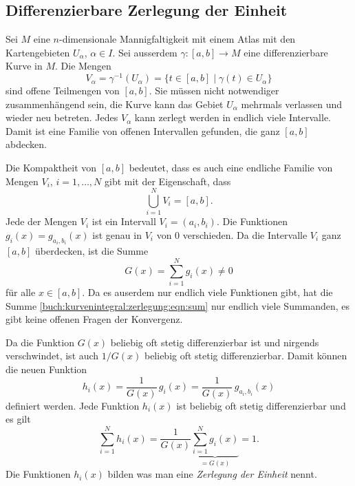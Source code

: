 \subsection{Differenzierbare Zerlegung der Einheit
\label{buch:kurvenintegral:zerlegug:subsection:dze}}
Sei $M$ eine $n$-dimensionale Mannigfaltigkeit mit einem Atlas mit
den Kartengebieten $U_\alpha$, $\alpha\in I$.
Sei ausserdem $\gamma\colon [a,b]\to M$ eine differenzierbare
Kurve in $M$.
Die Mengen
\[
V_\alpha
=
\gamma^{-1}(U_\alpha)
=
\{
t\in[a,b]
\mid
\gamma(t)\in U_\alpha
\}
\]
sind offene Teilmengen von $[a,b]$.
Sie müssen nicht notwendiger zusammenhängend sein, die Kurve kann
das Gebiet $U_\alpha$ mehrmals verlassen und wieder neu betreten.
Jedes $V_\alpha$ kann zerlegt werden in endlich viele Intervalle.
Damit ist eine Familie von offenen Intervallen gefunden, die ganz
$[a,b]$ abdecken.

Die Kompaktheit von $[a,b]$ bedeutet, dass es auch eine endliche
Familie von Mengen $V_i$, $i=1,\dots,N$ gibt mit der Eigenschaft,
dass
\[
\bigcup_{i=1}^N V_i = [a,b].
\]
Jede der Mengen $V_i$ ist ein Intervall $V_i=(a_i,b_i)$.
Die Funktionen $g_i(x) = g_{a_i,b_i}(x)$ ist genau in $V_i$
von $0$ verschieden.
Da die Intervalle $V_i$ ganz $[a,b]$ überdecken, ist die
Summe
\begin{equation}
G(x) = \sum_{i=1}^N g_i(x) \ne 0
\label{buch:kurvenintegral:zerlegung:eqn:sum}
\end{equation}
für alle $x\in[a,b]$.
Da es auserdem nur endlich viele Funktionen gibt, hat die Summe
\eqref{buch:kurvenintegral:zerlegung:eqn:sum}
nur endlich viele Summanden, es gibt keine offenen Fragen der
Konvergenz.

Da die Funktion $G(x)$ beliebig oft stetig differenzierbar ist
und nirgends verschwindet, ist auch $1/G(x)$ beliebig oft stetig
differenzierbar.
Damit können die neuen Funktion
\[
h_i(x)
=
\frac{1}{G(x)}\,g_i(x)
=
\frac{1}{G(x)}\,g_{a_i,b_i}(x)
\]
definiert werden.
Jede Funktion $h_i(x)$ ist beliebig oft stetig differenzierbar und
es gilt
\[
\sum_{i=1}^N h_i(x)
=
\frac{1}{G(x)}
\underbrace{\sum_{i=1}^N g_i(x)}_{\displaystyle=G(x)}
=
1.
\]
Die Funktionen $h_i(x)$ bilden was man eine {\em Zerlegung der Einheit}
nennt.
%

%
%
